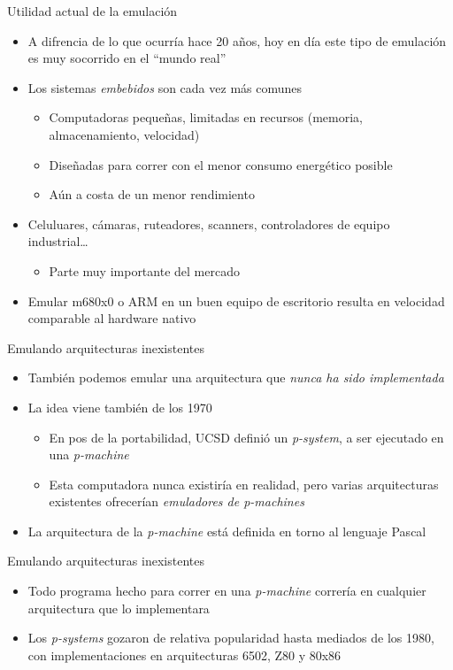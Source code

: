 \documentclass[presentation]{beamer}
\begin{document}
\begin{frame}[label={sec:org3812a26}]{Utilidad actual de la emulación}
\begin{itemize}
\item A difrencia de lo que ocurría hace 20 años, hoy en día este tipo de
emulación es muy socorrido en el ``mundo real''
\item Los sistemas \emph{embebidos} son cada vez más comunes
\begin{itemize}
\item Computadoras pequeñas, limitadas en recursos (memoria,
almacenamiento, velocidad)
\item Diseñadas para correr con el menor consumo energético posible
\item Aún a costa de un menor rendimiento
\end{itemize}
\item Celuluares, cámaras, ruteadores, scanners, controladores de equipo
industrial\ldots{}
\begin{itemize}
\item Parte muy importante del mercado
\end{itemize}
\item Emular m680x0 o ARM en un buen equipo de escritorio resulta en
velocidad comparable al hardware nativo
\end{itemize}
\end{frame}

\begin{frame}[label={sec:orgdc89f80}]{Emulando arquitecturas inexistentes}
\begin{itemize}
\item También podemos emular una arquitectura que \emph{nunca ha sido
implementada}
\item La idea viene también de los 1970
\begin{itemize}
\item En pos de la portabilidad, UCSD definió un \emph{p-system}, a ser
ejecutado en una \emph{p-machine}
\item Esta computadora nunca existiría en realidad, pero varias
arquitecturas existentes ofrecerían \emph{emuladores de p-machines}
\end{itemize}
\item La arquitectura de la \emph{p-machine} está definida en torno al lenguaje
Pascal
\end{itemize}
\end{frame}

\begin{frame}[label={sec:org04b54b6}]{Emulando arquitecturas inexistentes}
\begin{itemize}
\item Todo programa hecho para correr en una \emph{p-machine} correría en
cualquier arquitectura que lo implementara
\item Los \emph{p-systems} gozaron de relativa popularidad hasta mediados de
los 1980, con implementaciones en arquitecturas 6502, Z80 y 80x86
\end{itemize}
\end{frame}
\end{document}
